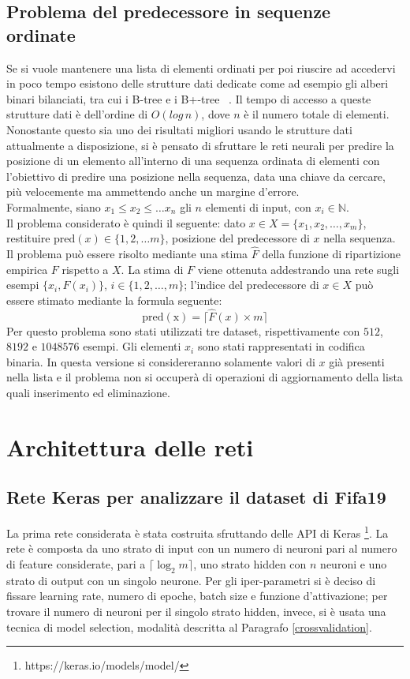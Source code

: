 \documentclass[12pt]{report}
\begin{document}
\subsection{Problema del predecessore in sequenze ordinate}\label{probPred}
Se si vuole mantenere una lista di elementi ordinati per poi riuscire ad accedervi in poco tempo esistono delle strutture dati dedicate come ad esempio gli alberi binari bilanciati, tra cui i B-tree e i B+-tree ~\cite{BTree}. Il tempo di accesso a queste strutture dati è dell'ordine di $O(log\,n)$, dove $n$ è il numero totale di elementi. Nonostante questo sia uno dei risultati migliori usando le strutture dati attualmente a disposizione, si è pensato di sfruttare le reti neurali per predire la posizione di un elemento all'interno di una sequenza ordinata di elementi con l'obiettivo di predire una posizione nella sequenza, data una chiave da cercare, più velocemente ma ammettendo anche un margine d'errore. \\
Formalmente, siano $x_1 \leq x_2 \leq \dots x_n$ gli $n$ elementi di input, con $x_i \in \mathbb{N}$.\\
Il problema considerato è quindi il seguente: dato $x \in X = \{x_1, x_2, \dots, x_m\}$, restituire $\mathrm{pred}(x) \in \{1, 2, \dots m\}$, posizione del predecessore di $x$ nella sequenza.
Il problema può essere risolto mediante una stima $\hat{F}$ della funzione di ripartizione empirica $F$ rispetto a $X$. La stima di $F$ viene ottenuta addestrando una rete sugli esempi $\{x_i, F(x_i)\}$, $i \in \{1, 2, \dots, m \}$; l'indice del predecessore di $x \in X$ può essere stimato mediante la formula seguente:
\begin{equation}
\mathrm{pred(x)} = \lceil\hat{F}(x)\times m\rceil
\label{empirical}
\end{equation}
Per questo problema sono stati utilizzati tre dataset, rispettivamente con $512$, $8192$ e $1048576$ esempi. Gli elementi $x_i$ sono stati rappresentati in codifica binaria. In questa versione si considereranno solamente valori di $x$ già presenti nella lista e il problema non si occuperà di operazioni di aggiornamento della lista quali inserimento ed eliminazione.

\section{Architettura delle reti}\label{architettura}
\subsection{Rete Keras per analizzare il dataset di Fifa19}
La prima rete considerata è stata costruita sfruttando delle API di Keras \footnote{https://keras.io/models/model/}. La rete è composta da uno strato di input con un numero di neuroni pari al numero di feature considerate, pari a $\lceil\log_2 m\rceil$, uno strato hidden con $n$ neuroni e uno strato di output con un singolo neurone. Per gli iper-parametri si è deciso di fissare learning rate, numero di epoche, batch size e funzione d'attivazione; per trovare il numero di neuroni per il singolo strato hidden, invece, si è usata una tecnica di model selection, modalità descritta al Paragrafo \ref{crossvalidation}.
\end{document}
